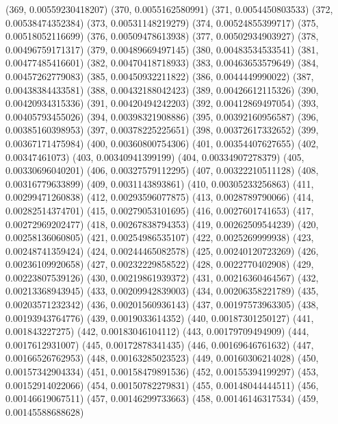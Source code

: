 {					(369, 0.00559230418207)
					(370, 0.0055162580991)
					(371, 0.0054450803533)
					(372, 0.00538474352384)
					(373, 0.00531148219279)
					(374, 0.00524855399717)
					(375, 0.00518052116699)
					(376, 0.00509478613938)
					(377, 0.00502934903927)
					(378, 0.00496759171317)
					(379, 0.00489669497145)
					(380, 0.00483534533541)
					(381, 0.00477485416601)
					(382, 0.00470418718933)
					(383, 0.00463653579649)
					(384, 0.00457262779083)
					(385, 0.00450932211822)
					(386, 0.0044449990022)
					(387, 0.00438384433581)
					(388, 0.00432188042423)
					(389, 0.00426612115326)
					(390, 0.00420934315336)
					(391, 0.00420494242203)
					(392, 0.00412869497054)
					(393, 0.00405793455026)
					(394, 0.00398321908886)
					(395, 0.00392160956587)
					(396, 0.00385160398953)
					(397, 0.00378225225651)
					(398, 0.00372617332652)
					(399, 0.00367171475984)
					(400, 0.00360800754306)
					(401, 0.00354407627655)
					(402, 0.00347461073)
					(403, 0.00340941399199)
					(404, 0.00334907278379)
					(405, 0.00330696040201)
					(406, 0.00327579112295)
					(407, 0.00322210511128)
					(408, 0.00316779633899)
					(409, 0.0031143893861)
					(410, 0.00305233256863)
					(411, 0.00299471260838)
					(412, 0.00293596077875)
					(413, 0.0028789790066)
					(414, 0.00282514374701)
					(415, 0.00279053101695)
					(416, 0.0027601741653)
					(417, 0.00272969202477)
					(418, 0.00267838794353)
					(419, 0.00262509544239)
					(420, 0.00258136060805)
					(421, 0.00254986535107)
					(422, 0.0025269999938)
					(423, 0.00248741359424)
					(424, 0.00244465082578)
					(425, 0.00240120723269)
					(426, 0.00236109920658)
					(427, 0.00232229858522)
					(428, 0.0022770402908)
					(429, 0.00223807539126)
					(430, 0.00219861939372)
					(431, 0.00216360464567)
					(432, 0.00213368943945)
					(433, 0.00209942839003)
					(434, 0.00206358221789)
					(435, 0.00203571232342)
					(436, 0.00201560936143)
					(437, 0.00197573963305)
					(438, 0.00193943764776)
					(439, 0.0019033614352)
					(440, 0.00187301250127)
					(441, 0.001843227275)
					(442, 0.00183046104112)
					(443, 0.00179709494909)
					(444, 0.0017612931007)
					(445, 0.00172878341435)
					(446, 0.00169646761632)
					(447, 0.00166526762953)
					(448, 0.00163285023523)
					(449, 0.00160306214028)
					(450, 0.00157342904334)
					(451, 0.00158479891536)
					(452, 0.00155394199297)
					(453, 0.00152914022066)
					(454, 0.00150782279831)
					(455, 0.00148044444511)
					(456, 0.00146619067511)
					(457, 0.00146299733663)
					(458, 0.00146146317534)
					(459, 0.00145588688628)
}
